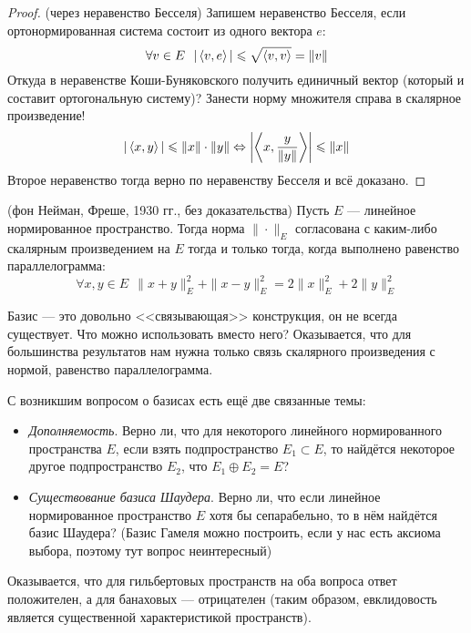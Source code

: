 \begin{proof} (через неравенство Бесселя)
	Запишем неравенство Бесселя, если ортонормированная система состоит из одного вектора $e$:
	\[
		\forall v \in E\ \ |\left\langle v, e\right\rangle| \leqslant \sqrt{\left\langle v, v\right\rangle} = \|v\|
	\]
	Откуда в неравенстве Коши-Буняковского получить единичный вектор (который и составит ортогональную систему)? Занести норму множителя справа в скалярное произведение!
	\[
		|\left\langle x, y\right\rangle| \leqslant \|x\| \cdot \|y\| \Leftrightarrow \left|\left\langle x, \frac{y}{\|y\|}\right\rangle\right| \leqslant \|x\|
	\]
	Второе неравенство тогда верно по неравенству Бесселя и всё доказано.
\end{proof}

\begin{theorem} (фон Нейман, Фреше, 1930 гг., без доказательства)
	Пусть $E$ --- линейное нормированное пространство. Тогда норма $\|\cdot\|_E$ согласована с каким-либо скалярным произведением на $E$ тогда и только тогда, когда выполнено равенство параллелограмма:
	\[
		\forall x, y \in E\ \ \|x + y\|_E^2 + \|x - y\|_E^2 = 2\|x\|_E^2 + 2\|y\|_E^2
	\]
\end{theorem}

\begin{note}
	Базис --- это довольно <<связывающая>> конструкция, он не всегда существует. Что можно использовать вместо него? Оказывается, что для большинства результатов нам нужна только связь скалярного произведения с нормой, равенство параллелограмма.
\end{note}

\begin{note}
	С возникшим вопросом о базисах есть ещё две связанные темы:
	\begin{itemize}
		\item \textit{Дополняемость}. Верно ли, что для некоторого линейного нормированного пространства $E$, если взять подпространство $E_1 \subset E$, то найдётся некоторое другое подпространство $E_2$, что $E_1 \oplus E_2 = E$?
		
		\item \textit{Существование базиса Шаудера}. Верно ли, что если линейное нормированное пространство $E$ хотя бы сепарабельно, то в нём найдётся базис Шаудера? (Базис Гамеля можно построить, если у нас есть аксиома выбора, поэтому тут вопрос неинтересный)
	\end{itemize}
	Оказывается, что для гильбертовых пространств на оба вопроса ответ положителен, а для банаховых --- отрицателен (таким образом, евклидовость является существенной характеристикой пространств).
\end{note}


